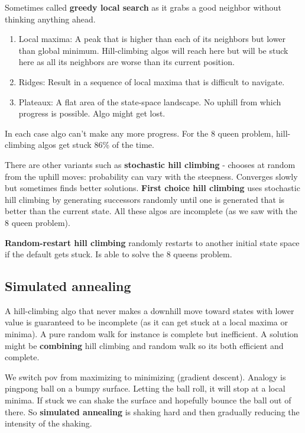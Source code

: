 Sometimes called \textbf{greedy local search}  as it grabs a good neighbor without thinking anything ahead.


\begin{enumerate}
    \item Local maxima: A peak that is higher than each of its neighbors but lower than global minimum. Hill-climbing algos will reach here but will be stuck here as all its neighbors are worse than its current position.
    \item Ridges: Result in a sequence of local maxima that is difficult to navigate.
    \item Plateaux: A flat area of the state-space landscape. No uphill from which progress is possible. Algo might get lost.
\end{enumerate}

In each case algo can't make any more progress. For the 8 queen problem, hill-climbing algos get stuck 86\% of the time.

There are other variants such as \textbf{stochastic hill climbing} - chooses at random from the uphill moves: probability can vary with the steepness. Converges slowly but sometimes finds better solutions. \textbf{First choice hill climbing}  uses stochastic hill climbing by generating successors randomly until one is generated that is better than the current state. All these algos are incomplete (as we saw with the 8 queen problem).

\textbf{Random-restart hill climbing} randomly restarts to another initial state space if the default gets stuck. Is able to solve the 8 queens problem.


\subsection{Simulated annealing}
A hill-climbing algo that never makes a downhill move toward states with lower value is guaranteed to be incomplete (as it can get stuck at a local maxima or minima). A pure random walk for instance is complete but inefficient. A solution might be \textbf{combining} hill climbing and random walk so its both efficient and complete.

We switch pov from maximizing to minimizing (gradient descent). Analogy is pingpong ball on a bumpy surface. Letting the ball roll, it will stop at a local minima. If stuck we can shake the surface and hopefully bounce the ball out of there. So \textbf{simulated annealing} is shaking hard and then gradually reducing the intensity of the shaking.

